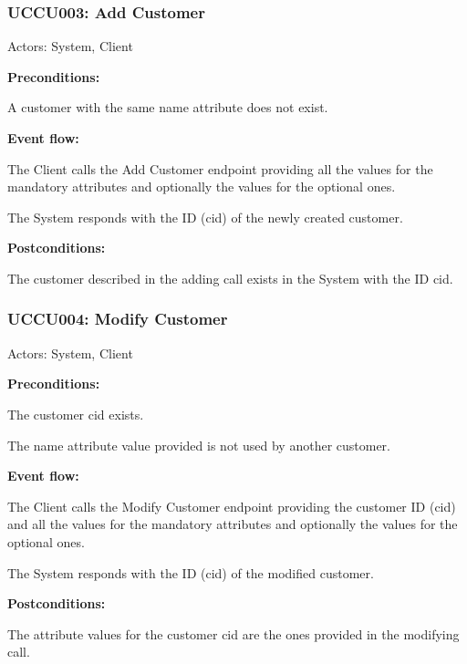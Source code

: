 \begin{ucbox}{\subsubsection{UCCU003: Add Customer}}
\label{UCCU003}

Actors: System, Client

\textbf{Preconditions:}

\ucitem A customer with the same name attribute does not exist.

\textbf{Event flow:}

\ucitem The Client calls the Add Customer endpoint providing all the values for the mandatory attributes and optionally the values for the optional ones.

\ucitem The System responds with the ID (cid) of the newly created customer.

\textbf{Postconditions:}

\ucitem The customer described in the adding call exists in the System with the ID cid.

\end{ucbox}

\begin{ucbox}{\subsubsection{UCCU004: Modify Customer}}
\label{UCCU004}

Actors: System, Client

\textbf{Preconditions:}

\ucitem The customer cid exists.

\ucitem The name attribute value provided is not used by another customer.

\textbf{Event flow:}

\ucitem The Client calls the Modify Customer endpoint providing the customer ID (cid) and all the values for the mandatory attributes and optionally the values for the optional 
ones.

\ucitem The System responds with the ID (cid) of the modified customer.

\textbf{Postconditions:}

\ucitem The attribute values for the customer cid are the ones provided in the modifying call.

\end{ucbox}

